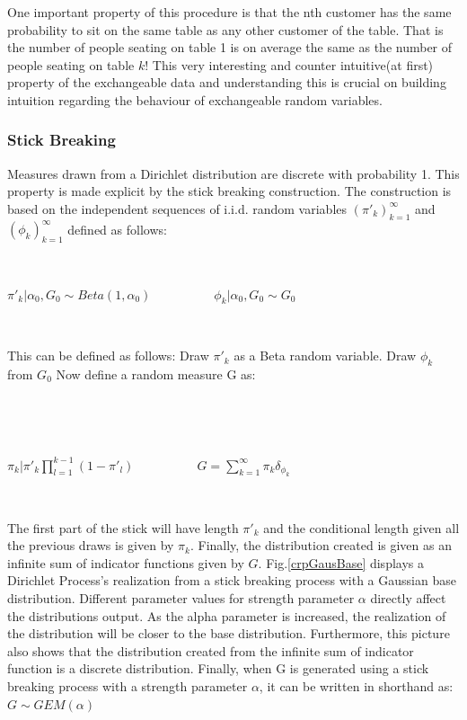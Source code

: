 \documentclass[twoside,hidelinks]{article}
\begin{document}
One important property of this procedure is that the nth customer has the same probability to sit on the same table as any other customer of the table. That is the number of people seating on table 1 is on average the same as the number of people seating on table $k$! This very interesting and counter intuitive(at first) property of the exchangeable data and understanding this is crucial on building intuition regarding the behaviour of exchangeable random variables.


\subsubsection{Stick Breaking}

Measures drawn from a Dirichlet distribution are discrete with probability 1. This property is made explicit by the stick breaking construction. The construction is based on the independent sequences of i.i.d. random variables $(\pi'_k)_{k=1}^\infty$ and $ ( \phi_k)_{k=1}^\infty$  defined as follows:

\ \ 

\centerline{ $\pi'_k  | \alpha_0, G_0 \sim Beta(1, \alpha_0)$\ \ \ \ \ \ \ \ \ \ $  \phi_k | \alpha_0, G_0 \sim G_0 $} 

\ \ 

This can be defined as follows: Draw $\pi'_k$ as a Beta random variable. Draw $\phi_k$ from $G_0$ Now define a random measure G as:

\ \

\ \
\centerline{ $\pi_k  | \pi'_k \prod_{l=1}^{k-1}(1- \pi'_l   )$\ \ \ \ \ \ \ \ \ \   $  G = \sum_{k=1}^\infty \pi_k \delta_{\phi_k} $}
\ \

The first part of the stick will have length $\pi'_k$ and the conditional length given all the previous draws is given by $\pi_k$. Finally, the distribution created is given as an infinite sum of indicator functions given by $G$. Fig.\ref{crpGausBase} displays a Dirichlet Process's realization from a stick breaking process with a Gaussian base distribution. Different parameter values for strength parameter $\alpha$ directly affect the distributions output. As the alpha parameter is increased, the realization of the distribution will be closer to the base distribution. Furthermore, this picture also shows that the distribution created from the infinite sum of indicator function is a discrete distribution. Finally, when G is generated using a stick breaking process with a strength parameter $\alpha$, it can be written in shorthand as: $ G \sim GEM(\alpha) $
\end{document}
